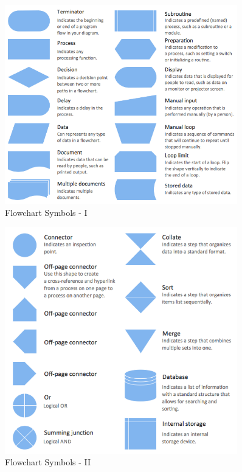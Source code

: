 \begin{figure}[!h]
    	\centering
    	\includegraphics[width= 0.9\textwidth]{images/Design-Elements-Flowchart1.png}
    	\caption [Flowchart Symbols - I]{Flowchart Symbols - I}  
    	\label{fig:Flowchart Symbols}
\end{figure}

\clearpage

\begin{figure}[h]
    	\centering
    	\includegraphics[width= 0.9\textwidth]{images/Design-Elements-Flowchart2.png}
    	\caption [Flowchart Symbols - II]{Flowchart Symbols - II}  
    	\label{fig:Flowchart Symbols}
\end{figure}

